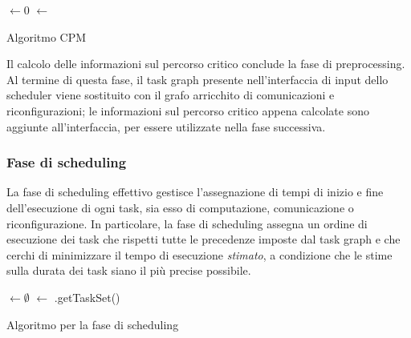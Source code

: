 \IncMargin{1em}
\begin{algorithm}[!htbp]
 
 \BlankLine
  $\leftarrow 0$\;
  $\leftarrow$ \;
 \caption{Algoritmo CPM}
\label{alg:CPM}
\end{algorithm}
\DecMargin{1em}

Il calcolo delle informazioni sul percorso critico conclude la fase di 
preprocessing. Al termine di questa fase, il task graph presente 
nell'interfaccia di input dello scheduler viene sostituito con il grafo 
arricchito di comunicazioni e riconfigurazioni; le informazioni sul percorso 
critico appena calcolate sono aggiunte all'interfaccia, per essere utilizzate 
nella fase successiva.


\subsubsection{Fase di scheduling}
\label{subsec:faseScheduling}
La fase di scheduling effettivo gestisce l'assegnazione di tempi di inizio e 
fine dell'esecuzione di ogni task, sia esso di computazione, comunicazione o 
riconfigurazione. In particolare, la fase di scheduling assegna un ordine di 
esecuzione dei task che rispetti tutte le precedenze imposte dal task graph e 
che cerchi di minimizzare il tempo di esecuzione \emph{stimato}, a condizione
che le stime sulla durata dei task siano il più precise possibile.

\IncMargin{1em}
\begin{algorithm}[!htbp]
 
 \BlankLine
 \SchedulerOutput $\leftarrow \emptyset$\;
 \UnscheduledSet $\leftarrow$ \SchedulerInput.getTaskSet()\;
 \Return{\SchedulerOutput}
\caption{Algoritmo per la fase di scheduling}
\label{alg:faseScheduling}
\end{algorithm}
\DecMargin{1em}

